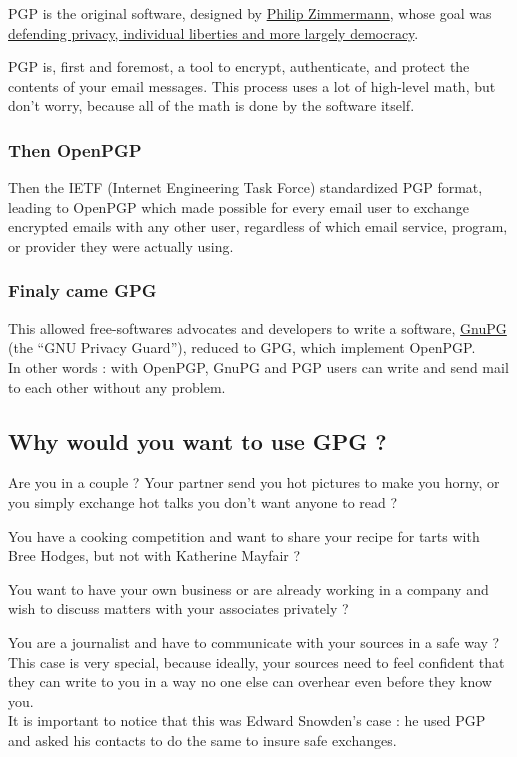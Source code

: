 PGP is the original software, designed by
\href{http://philzimmermann.com/EN/background/index.html}{Philip
Zimmermann}, whose goal was
\href{http://www.philzimmermann.com/EN/essays/WhyIWrotePGP.html}{defending
privacy, individual liberties and more largely democracy}.

PGP is, first and foremost, a tool to encrypt, authenticate, and protect
the contents of your email messages. This process uses a lot of
high-level math, but don't worry, because all of the math is done by the
software itself.

\subsubsection{Then OpenPGP}\label{then-openpgp}

Then the IETF (Internet Engineering Task Force) standardized PGP format,
leading to OpenPGP which made possible for every email user to exchange
encrypted emails with any other user, regardless of which email service,
program, or provider they were actually using.

\subsubsection{Finaly came GPG}\label{finaly-came-gpg}

This allowed free-softwares advocates and developers to write a
software, \href{https://www.gnupg.org/}{GnuPG} (the ``GNU Privacy
Guard''), reduced to GPG, which implement OpenPGP.\\In other words :
with OpenPGP, GnuPG and PGP users can write and send mail to each other
without any problem.

\subsection{Why would you want to use GPG ?}\label{why-would-you-want-to-use-gpg}

Are you in a couple ? Your partner send you hot pictures to make you
horny, or you simply exchange hot talks you don't want anyone to read ?

You have a cooking competition and want to share your recipe for tarts
with Bree Hodges, but not with Katherine Mayfair ?

You want to have your own business or are already working in a company
and wish to discuss matters with your associates privately ?

You are a journalist and have to communicate with your sources in a safe
way ?\\This case is very special, because ideally, your sources need to
feel confident that they can write to you in a way no one else can
overhear even before they know you.\\It is important to notice that this
was Edward Snowden's case : he used PGP and asked his contacts to do the
same to insure safe exchanges.


